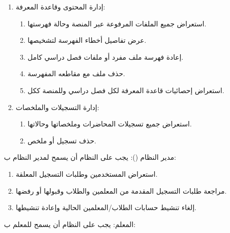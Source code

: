 \begin{enumerate}
\begin{enumerate}
    \item الإنهاء القسري لجلسة مباشرة متوقفة، على أن يتم ذلك بصورة آمنة تضمن اكتمال تسجيل المحاضرة وتوليد ملخصها.
    \item حذف جلسة مع ما يتبعها من تسجيلات ومخرجات.
  \end{enumerate}
  \item إدارة المحتوى وقاعدة المعرفة:
  \begin{enumerate}
    \item استعراض جميع الملفات المرفوعة عبر المنصة وحالة فهرستها.
    \item عرض تفاصيل أخطاء الفهرسة لتشخيصها.
    \item إعادة فهرسة ملف مفرد أو ملفات فصل دراسي كامل.
    \item حذف ملف مع مقاطعه المفهرسة.
    \item استعراض إحصائيات قاعدة المعرفة لكل فصل دراسي وللمنصة ككل.
  \end{enumerate}
  \item إدارة التسجيلات والملخصات:
  \begin{enumerate}
    \item استعراض جميع تسجيلات المحاضرات وملخصاتها وحالاتها.
    \item حذف تسجيل أو ملخص.
  \end{enumerate}
\end{enumerate}

\noindent مدير النظام (): يجب على النظام أن يسمح لمدير النظام ب:

\begin{enumerate}
  \item استعراض المستخدمين وطلبات التسجيل المعلقة.
  \item مراجعة طلبات التسجيل المقدمة من المعلمين والطلاب وقبولها أو رفضها.
  \item إلغاء تنشيط حسابات الطلاب/المعلمين الحالية وإعادة تنشيطها.
\end{enumerate}

\noindent المعلم: يجب على النظام أن يسمح للمعلم ب:

